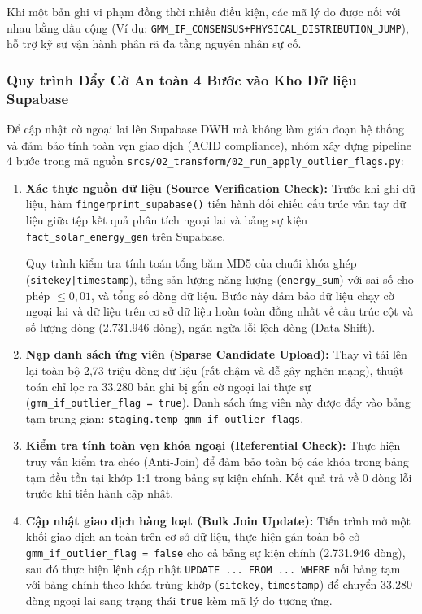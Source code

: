 \documentclass[12pt, a4paper]{report}
\begin{document}
Khi một bản ghi vi phạm đồng thời nhiều điều kiện, các mã lý do được nối với nhau bằng dấu cộng (Ví dụ: \texttt{GMM\_IF\_CONSENSUS+PHYSICAL\_DISTRIBUTION\_JUMP}), hỗ trợ kỹ sư vận hành phân rã đa tầng nguyên nhân sự cố.

\subsubsection{Quy trình Đẩy Cờ An toàn 4 Bước vào Kho Dữ liệu Supabase}
Để cập nhật cờ ngoại lai lên Supabase DWH mà không làm gián đoạn hệ thống và đảm bảo tính toàn vẹn giao dịch (ACID compliance), nhóm xây dựng pipeline 4 bước trong mã nguồn \texttt{srcs/02\_transform/02\_run\_apply\_outlier\_flags.py}:
\begin{enumerate}
    \item \textbf{Xác thực nguồn dữ liệu (Source Verification Check):} Trước khi ghi dữ liệu, hàm \texttt{fingerprint\_supabase()} tiến hành đối chiếu cấu trúc vân tay dữ liệu giữa tệp kết quả phân tích ngoại lai và bảng sự kiện \texttt{fact\_solar\_energy\_gen} trên Supabase. 
    
    Quy trình kiểm tra tính toán tổng băm MD5 của chuỗi khóa ghép (\texttt{sitekey|timestamp}), tổng sản lượng năng lượng (\texttt{energy\_sum}) với sai số cho phép $\le 0{,}01$, và tổng số dòng dữ liệu. Bước này đảm bảo dữ liệu chạy cờ ngoại lai và dữ liệu trên cơ sở dữ liệu hoàn toàn đồng nhất về cấu trúc cột và số lượng dòng (2.731.946 dòng), ngăn ngừa lỗi lệch dòng (Data Shift).
    
    \item \textbf{Nạp danh sách ứng viên (Sparse Candidate Upload):} Thay vì tải lên lại toàn bộ 2,73 triệu dòng dữ liệu (rất chậm và dễ gây nghẽn mạng), thuật toán chỉ lọc ra 33.280 bản ghi bị gắn cờ ngoại lai thực sự (\texttt{gmm\_if\_outlier\_flag = true}). Danh sách ứng viên này được đẩy vào bảng tạm trung gian: \texttt{staging.temp\_gmm\_if\_outlier\_flags}.
    
    \item \textbf{Kiểm tra tính toàn vẹn khóa ngoại (Referential Check):} Thực hiện truy vấn kiểm tra chéo (Anti-Join) để đảm bảo toàn bộ các khóa trong bảng tạm đều tồn tại khớp 1:1 trong bảng sự kiện chính. Kết quả trả về 0 dòng lỗi trước khi tiến hành cập nhật.
    
    \item \textbf{Cập nhật giao dịch hàng loạt (Bulk Join Update):} Tiến trình mở một khối giao dịch an toàn trên cơ sở dữ liệu, thực hiện gán toàn bộ cờ \texttt{gmm\_if\_outlier\_flag = false} cho cả bảng sự kiện chính (2.731.946 dòng), sau đó thực hiện lệnh cập nhật \texttt{UPDATE ... FROM ... WHERE} nối bảng tạm với bảng chính theo khóa trùng khớp (\texttt{sitekey}, \texttt{timestamp}) để chuyển 33.280 dòng ngoại lai sang trạng thái \texttt{true} kèm mã lý do tương ứng.
\end{enumerate}
\end{document}
